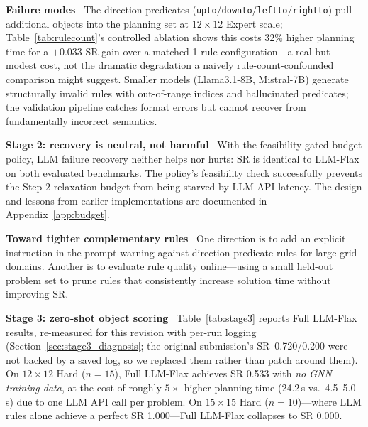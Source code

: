 \documentclass[letterpaper, 10pt, journal, twoside]{IEEEtran}
\newcommand{\sref}[1]{Section~\ref{#1}}
\newcommand{\tref}[1]{Table~\ref{#1}}
\newcommand{\myparagraph}[1]{\noindent\textbf{#1}~}
\newcommand{\method}{LLM-Flax\xspace}
\newcommand{\fullmethod}{Full LLM-Flax\xspace}
\begin{document}
\myparagraph{Failure modes}
The direction predicates (\texttt{upto}/\texttt{downto}/\texttt{leftto}/\texttt{rightto}) pull additional objects into the planning set at $12{\times}12$ Expert scale; \tref{tab:rulecount}'s controlled ablation shows this costs $32\%$ higher planning time for a $+0.033$ SR gain over a matched 1-rule configuration---a real but modest cost, not the dramatic degradation a naively rule-count-confounded comparison might suggest.
Smaller models (Llama3.1-8B, Mistral-7B) generate structurally invalid rules with out-of-range indices and hallucinated predicates; the validation pipeline catches format errors but cannot recover from fundamentally incorrect semantics.

\myparagraph{Stage 2: recovery is neutral, not harmful}
With the feasibility-gated budget policy, LLM failure recovery neither helps nor hurts: SR is identical to \method on both evaluated benchmarks.
The policy's feasibility check successfully prevents the Step-2 relaxation budget from being starved by LLM API latency.
The design and lessons from earlier implementations are documented in Appendix~\ref{app:budget}.

\myparagraph{Toward tighter complementary rules}
One direction is to add an explicit instruction in the prompt warning against direction-predicate rules for large-grid domains.
Another is to evaluate rule quality online---using a small held-out problem set to prune rules that consistently increase solution time without improving SR.

\myparagraph{Stage 3: zero-shot object scoring}
\tref{tab:stage3} reports \fullmethod results, re-measured for this revision with per-run logging (\sref{sec:stage3_diagnosis}; the original submission's SR~0.720/0.200 were not backed by a saved log, so we replaced them rather than patch around them).
On $12{\times}12$ Hard ($n{=}15$), \fullmethod achieves SR 0.533 with \emph{no GNN training data}, at the cost of roughly $5\times$ higher planning time (24.2\,s vs.\ 4.5--5.0\,s) due to one LLM API call per problem.
On $15{\times}15$ Hard ($n{=}10$)---where LLM rules alone achieve a perfect SR 1.000---\fullmethod collapses to SR 0.000.
\end{document}
